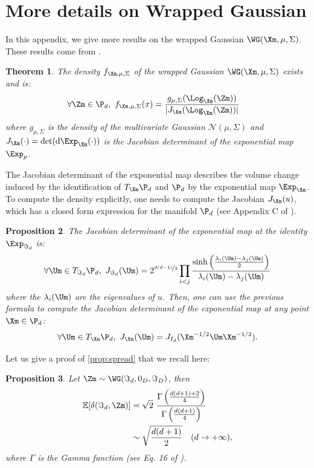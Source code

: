 \documentclass[10pt]{article} %
\theoremstyle{plain}
\newtheorem{theorem}{Theorem}[section]
\newtheorem{proposition}[theorem]{Proposition}
\theoremstyle{definition}
\theoremstyle{remark}
\begin{document}
\appendix

\onecolumn

\section{More details on Wrapped Gaussian}
In this appendix, we give more results on the wrapped Gaussian $\WG(\Xm, \mu, \Sigma)$. These results come from \citep{desurrel2025wrappedgaussianmanifoldsymmetric}.
\begin{theorem}
  The density $f_{\Xm,\mu,\Sigma}$ of the wrapped Gaussian $\WG(\Xm, \mu, \Sigma)$ exists and is:
  \begin{equation}
    \label{eq:density}
    \begin{aligned}
      &\forall \Zm \in \P_d,~f_{\Xm,\mu,\Sigma}(x) = \frac{g_{\mu,\Sigma}(\Log_{\Xm}(\Zm))}{|J_{\Xm}(\Log_{\Xm}(\Zm))|}
    \end{aligned}
  \end{equation}
  where $g_{\mu, \Sigma}$ is the density of the multivariate Gaussian $\mathcal{N}(\mu, \Sigma)$ and $J_{\Xm}(\cdot ) = \det(\mathrm{d} \Exp_{\Xm}(\cdot))$ is the Jacobian determinant of the exponential map $\Exp_p$.
  \label{theo:density}
\end{theorem}

The Jacobian determinant of the exponential map describes the volume change induced by the identification of $T_{\Xm}\P_d$ and $\P_d$ by the exponential map $\Exp_{\Xm}$. To compute the density explicitly, one needs to compute the Jacobian $J_{\Xm}(u)$, which has a closed form expression for the manifold $\P_d$ (see Appendix C of  \citealt{desurrel2025wrappedgaussianmanifoldsymmetric}).
\begin{proposition}
  \label{prop:jac_exp}
  The Jacobian determinant of the exponential map at the identity $\Exp_{\Im_d}$ is:
  $$\forall \Um \in T_{\Im_d} \P_d,~ J_{\Im_d}(\Um) = 2^{\nicefrac{d(d-1)}{2}} \prod_{i < j} \frac{\sinh\left(\frac{\lambda_i(\Um) - \lambda_j(\Um)}{2}\right)}{\lambda_i(\Um) - \lambda_j(\Um)}$$
  where the $\lambda_i(\Um)$ are the eigenvalues of $u$.
  Then, one can use the previous formula to compute the Jacobian determinant of the exponential map at any point $\Xm \in \P_d$:
  $$\forall \Um \in T_{\Xm} \P_d,~ J_{\Xm}(\Um) = J_{I_d}(\Xm^{-1/2}\Um\Xm^{-1/2}).$$
\end{proposition}

Let us give a proof of \cref{prop:spread} that we recall here:
\begin{proposition}
  Let $\Zm \sim \WG(\Im_d, 0_D, \Im_D)$, then
  \begin{equation*}
    \begin{aligned}
      \mathbb{E}[\delta(\Im_d, \Zm)] &= \sqrt{2}~\frac{\Gamma\left(\frac{d(d+1)+2}{4}\right)}{\Gamma\left(\frac{d(d+1)}{4}\right)} \\
      &\sim \sqrt{\frac{d(d+1)}{2}} \quad (d \rightarrow +\infty),
    \end{aligned}
  \end{equation*}
  where $\Gamma$ is the Gamma function (see Eq. 16 of \citealt{euler}).
\end{proposition}
\end{document}
